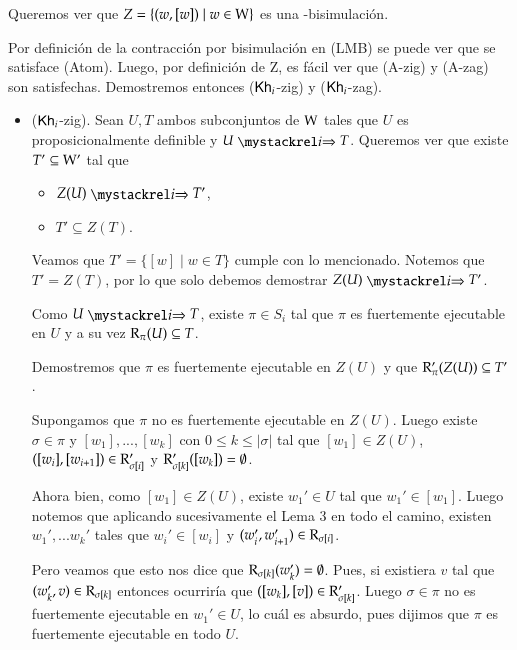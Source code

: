 \begin{demostracion}
    Queremos ver que $Z = \{(w,[w]) \mid w \in \mathrm{W}\}$ es una \KHilogic-bisimulación.
    
    Por definición de la contracción por bisimulación en (LMB) se puede ver que se satisface (Atom). Luego, por definición de Z, es fácil ver que (A-zig) y (A-zag) son satisfechas. Demostremos entonces ($\mathsf{Kh}_i$-zig) y ($\mathsf{Kh}_i$-zag).

    \begin{itemize}
        \item ($\mathsf{Kh}_i$-zig). Sean $U, T$ ambos subconjuntos de $\mathrm{W}$ tales que $U$ es proposicionalmente definible y $U \ultsExecAgi T$. Queremos ver que existe $T' \subseteq \mathrm{W}'$ tal que

        \begin{multicols}{2}
            \begin{itemize}
                \item $Z(U) \ultsExecAgi T'$, 
                \item $T' \subseteq Z(T)$.
            \end{itemize}
        \end{multicols}
        Veamos que $T' = \{[w] \mid w \in T\}$ cumple con lo mencionado. Notemos que $T' = Z(T)$, por lo que solo debemos demostrar $Z(U) \ultsExecAgi T'$.

        Como $U \ultsExecAgi T$, existe $\pi \in S_i$ tal que $\pi$ es fuertemente ejecutable en $U$ y a su vez $\mathrm{R}_\pi(U) \subseteq T$.

        Demostremos que $\pi$ es fuertemente ejecutable en $Z(U)$ y que $\mathrm{R}'_\pi(Z(U)) \subseteq T'$.

        Supongamos que $\pi$ no es fuertemente ejecutable en $Z(U)$. Luego existe $\sigma \in \pi$ y $[w_1],...,[w_k]$ con $0 \le k \le |\sigma|$ tal que $[w_1] \in Z(U)$, $([w_i], [w_{i+1}]) \in \mathrm{R}'_{\sigma[i]}$ y $\mathrm{R}'_{\sigma[k]}([w_k]) = \emptyset$.

        Ahora bien, como $[w_1] \in Z(U)$, existe $w_1' \in U$ tal que $w_1' \in [w_1]$. Luego notemos que aplicando sucesivamente el Lema 3 en todo el camino, existen $w_1',...w_k'$ tales que $w_i' \in [w_i]$ y $(w_i',w_{i+1}') \in \mathrm{R}_{\sigma[i]}$.

        Pero veamos que esto nos dice que $\mathrm{R}_{\sigma[k]}(w_k') = \emptyset$. Pues, si existiera $v$ tal que $(w_k',v) \in \mathrm{R}_{\sigma[k]}$ entonces ocurriría que $([w_k],[v]) \in \mathrm{R}'_{\sigma[k]}$. Luego $\sigma \in \pi$ no es fuertemente ejecutable en $w_1' \in U$, lo cuál es absurdo, pues dijimos que $\pi$ es fuertemente ejecutable en todo $U$.


\end{itemize}
\end{demostracion}
